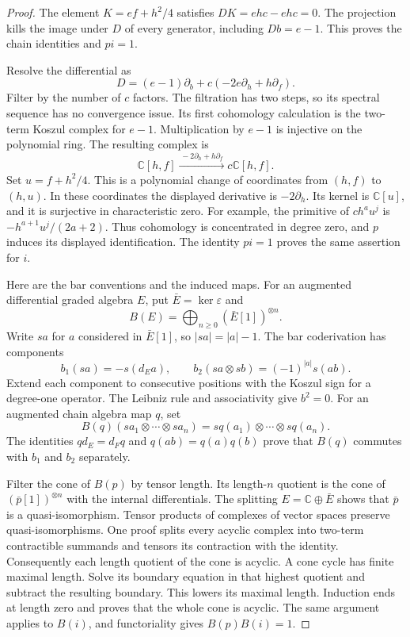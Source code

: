 \begin{proof}
The element $K=ef+h^2/4$ satisfies
$DK=ehc-ehc=0$.
The projection kills the image under $D$ of every generator, including $Db=e-1$.
This proves the chain identities and $pi=1$.

Resolve the differential as
\[
 D=(e-1)\partial_b+c(-2e\partial_h+h\partial_f).
\]
Filter by the number of $c$ factors.
The filtration has two steps, so its spectral sequence has no convergence issue.
Its first cohomology calculation is the two-term Koszul complex for $e-1$.
Multiplication by $e-1$ is injective on the polynomial ring.
The resulting complex is
\[
 \mathbb C[h,f]\xrightarrow{\,-2\partial_h+h\partial_f\,}
 c\mathbb C[h,f].
\]
Set $u=f+h^2/4$.
This is a polynomial change of coordinates from $(h,f)$ to $(h,u)$.
In these coordinates the displayed derivative is $-2\partial_h$.
Its kernel is $\mathbb C[u]$, and it is surjective in characteristic zero.
For example, the primitive of $c h^a u^j$ is $-h^{a+1}u^j/(2a+2)$.
Thus cohomology is concentrated in degree zero, and $p$ induces its displayed identification.
The identity $pi=1$ proves the same assertion for $i$.

Here are the bar conventions and the induced maps.
For an augmented differential graded algebra $E$, put $\bar E=\ker\varepsilon$ and
\[
 B(E)=\bigoplus_{n\geq0}(\bar E[1])^{\otimes n}.
\]
Write $sa$ for $a$ considered in $\bar E[1]$, so $|sa|=|a|-1$.
The bar coderivation has components
\[
 b_1(sa)=-s(d_Ea),\qquad
 b_2(sa\otimes sb)=(-1)^{|a|}s(ab).
\]
Extend each component to consecutive positions with the Koszul sign for a degree-one operator.
The Leibniz rule and associativity give $b^2=0$.
For an augmented chain algebra map $q$, set
\[
 B(q)(sa_1\otimes\cdots\otimes sa_n)
 =s q(a_1)\otimes\cdots\otimes s q(a_n).
\]
The identities $q d_E=d_Fq$ and $q(ab)=q(a)q(b)$ prove that $B(q)$ commutes with $b_1$ and $b_2$ separately.

Filter the cone of $B(p)$ by tensor length.
Its length-$n$ quotient is the cone of $(\bar p[1])^{\otimes n}$ with the internal differentials.
The splitting $E=\mathbb C\oplus\bar E$ shows that $\bar p$ is a quasi-isomorphism.
Tensor products of complexes of vector spaces preserve quasi-isomorphisms.
One proof splits every acyclic complex into two-term contractible summands and tensors its contraction with the identity.
Consequently each length quotient of the cone is acyclic.
A cone cycle has finite maximal length.
Solve its boundary equation in that highest quotient and subtract the resulting boundary.
This lowers its maximal length.
Induction ends at length zero and proves that the whole cone is acyclic.
The same argument applies to $B(i)$, and functoriality gives $B(p)B(i)=1$.
\end{proof}

